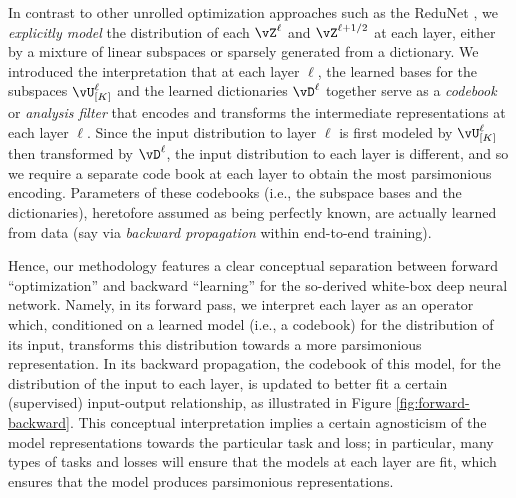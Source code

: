 \documentclass[../../book-main.tex]{subfiles}
\begin{document}

\begin{remark}\label{sub:forward_backward}
    In contrast to other unrolled optimization approaches such as the ReduNet \cite{chan2021redunet}, we \textit{explicitly model} the distribution of each $\vZ^\ell$ and $\vZ^{\ell + 1/2}$ at each layer, either by a mixture of linear subspaces or sparsely generated from a dictionary. We introduced the interpretation that at each layer \(\ell\), the learned bases for the subspaces \(\vU_{[K]}^{\ell}\) and the learned dictionaries \(\vD^{\ell}\) together serve as a \textit{codebook} or \textit{analysis filter} that encodes and transforms the intermediate representations at each layer \(\ell\). Since the input distribution to layer \(\ell\) is first modeled by \(\vU_{[K]}^{\ell}\) then transformed by \(\vD^{\ell}\), the input distribution to each layer is different, and so we require a separate code book at each layer to obtain the most parsimonious encoding. Parameters of these codebooks (i.e., the subspace bases and the dictionaries), heretofore assumed as being perfectly known, are actually learned from data (say via \textit{backward propagation} within end-to-end training).
    
    Hence, our methodology features a clear conceptual separation between forward ``optimization'' and backward ``learning'' for the so-derived white-box deep neural network. Namely, in its forward pass, we interpret each layer as an operator which, conditioned on a learned model (i.e., a codebook) for the distribution of its input, transforms this distribution towards a more parsimonious representation. In its backward propagation, the codebook of this model, for the distribution of the input to each layer, is updated to better fit a certain (supervised) input-output relationship, as illustrated in Figure \ref{fig:forward-backward}. This conceptual interpretation implies a certain agnosticism of the model representations towards the particular task and loss; in particular, many types of tasks and losses will ensure that the models at each layer are fit, which ensures that the model produces parsimonious representations.
\end{remark}
\end{document}
